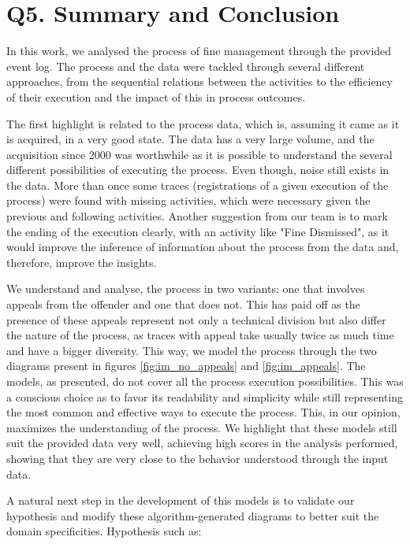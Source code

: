 \documentclass[12pt]{report}
\begin{document}
\section{Q5. Summary and Conclusion}

In this work, we analysed the process of fine management through the provided event log. The process and the data were tackled through several different approaches, from the sequential relations between the activities to the efficiency of their execution and the impact of this in process outcomes.

The first highlight is related to the process data, which is, assuming it came as it is acquired, in a very good state. The data has a very large volume, and the acquisition since 2000 was worthwhile as it is possible to understand the several different possibilities of executing the process. Even though, noise still exists in the data. More than once some traces (registrations of a given execution of the process) were found with missing activities, which were necessary given the previous and following activities. Another suggestion from our team is to mark the ending of the execution clearly, with an activity like "Fine Dismissed", as it would improve the inference of information about the process from the data and, therefore, improve the insights.

We understand and analyse, the process in two variants: one that involves appeals from the offender and one that does not. This has paid off as the presence of these appeals represent not only a technical division but also differ the nature of the process, as traces with appeal take usually twice as much time and have a bigger diversity. This way, we model the process through the two diagrams present in figures \ref{fig:im_no_appeals} and \ref{fig:im_appeals}. The models, as presented, do not cover all the process execution possibilities. This was a conscious choice as to favor its readability and simplicity while still representing the most common and effective ways to execute the process. This, in our opinion, maximizes the understanding of the process. We highlight that these models still suit the provided data very well, achieving high scores in the analysis performed, showing that they are very close to the behavior understood through the input data.

A natural next step in the development of this models is to validate our hypothesis and modify these algorithm-generated diagrams to better suit the domain specificities. Hypothesis such as:
\end{document}
